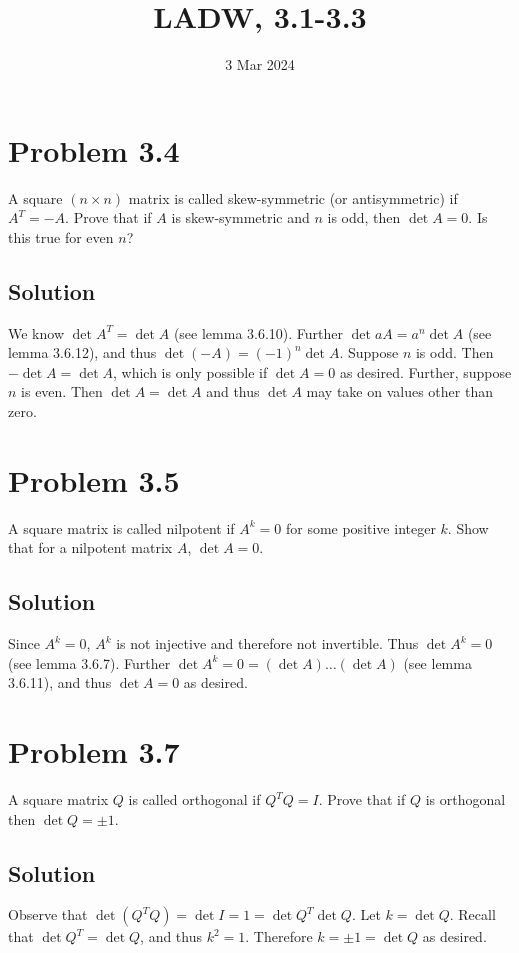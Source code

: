 \documentclass{article}
\title{LADW, 3.1-3.3}
\date{3 Mar 2024}
\begin{document}
\maketitle

\section*{Problem 3.4}
A square $(n\times n)$ matrix is called skew-symmetric (or antisymmetric) if $A^T=-A$. Prove that if $A$ is skew-symmetric and $n$ is odd, then $\det A = 0$. Is this true for even $n$?

\subsection*{Solution}
We know $\det A^T=\det A$ (see lemma 3.6.10). Further $\det aA=a^n\det A$ (see lemma 3.6.12), and thus $\det (-A)=(-1)^n\det A$. Suppose $n$ is odd. Then $-\det A=\det A$, which is only possible if $\det A=0$ as desired. Further, suppose $n$ is even. Then $\det A=\det A$ and thus $\det A$ may take on values other than zero.

\section*{Problem 3.5}
A square matrix is called nilpotent if $A^k=0$ for some positive integer $k$. Show that for a nilpotent matrix $A$, $\det A=0$.

\subsection*{Solution}
Since $A^k=0$, $A^k$ is not injective and therefore not invertible. Thus $\det A^k=0$ (see lemma 3.6.7). Further $\det A^k=0=(\det A)\ldots(\det A)$ (see lemma 3.6.11), and thus $\det A=0$ as desired.

\section*{Problem 3.7}
A square matrix $Q$ is called orthogonal if $Q^TQ=I$. Prove that if $Q$ is orthogonal then $\det Q=\pm1$.

\subsection*{Solution}
Observe that $\det(Q^TQ)=\det I=1=\det Q^T\det Q$. Let $k=\det Q$. Recall that $\det Q^T=\det Q$, and thus $k^2=1$. Therefore $k=\pm 1=\det Q$ as desired.
\end{document}

